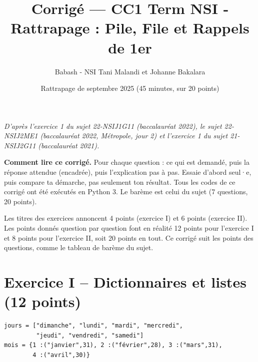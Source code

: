 \documentclass[11pt, a4paper]{exam}
\title{Corrigé — CC1 Term NSI - Rattrapage : Pile, File et Rappels de 1er}
\author{Babash - NSI Tani Malandi et Johanne Bakalara}
\date{Rattrapage de septembre 2025 (45 minutes, sur 20 points)}
\begin{document}
\pagestyle{headandfoot}
\firstpageheader{}{}{}
\runningheadrule
{}

\maketitle
\thispagestyle{headandfoot}
\begin{center}\footnotesize\itshape D'après l'exercice 1 du sujet 22-NSIJ1G11 (baccalauréat 2022), le sujet 22-NSIJ2ME1 (baccalauréat 2022, Métropole, jour 2) et l'exercice 1 du sujet 21-NSIJ2G11 (baccalauréat 2021).\end{center}

\begin{tcolorbox}[colback=white, colframe=black, boxrule=0.5pt, arc=1mm, left=2mm, right=2mm]
\small\textbf{Comment lire ce corrigé.} Pour chaque question : ce qui est demandé, puis la réponse attendue (encadrée), puis l'explication pas à pas. Essaie d'abord seul·e, puis compare ta démarche, pas seulement ton résultat. Tous les codes de ce corrigé ont été exécutés en Python 3.
Le barème est celui du sujet (7 questions, 20 points).
\end{tcolorbox}

\begin{remarque}
Les titres des exercices annoncent 4 points (exercice I) et 6 points (exercice II). Les points donnés question par question font en réalité 12 points pour l'exercice I et 8 points pour l'exercice II, soit 20 points en tout. Ce corrigé suit les points des questions, comme le tableau de barème du sujet.
\end{remarque}

\section*{Exercice I -- Dictionnaires et listes (12 points)}

\begin{lstlisting}
jours = ["dimanche", "lundi", "mardi", "mercredi",
         "jeudi", "vendredi", "samedi"]
mois = {1 :("janvier",31), 2 :("février",28), 3 :("mars",31),
        4 :("avril",30)}
\end{lstlisting}
\end{document}
